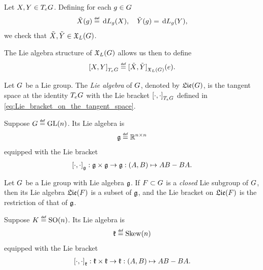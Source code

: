 Let $X, Y \in \TangentSpace \Group e$.
Defining for each $g \in \Group$
\begin{align*}
    \tilde X(g) \defeq \dd L_g(X), \quad \tilde Y(g) = \dd L_g(Y),
\end{align*}
we check that $\tilde X, \tilde Y \in \LeftInvariantVectorFields$.

The Lie algebra structure of $\LeftInvariantVectorFields$ allows us then to define
\begin{align}
    \LieBracket [\TangentSpace \Group e] X Y \defeq \LieBracket [\LeftInvariantVectorFields] {\tilde X} {\tilde Y}(e).
    \label{eq:Lie_bracket_on_the_tangent_space}
\end{align}

\begin{definition}
\label{definition:Lie_algebra_of_Lie_group}
    Let $\Group$ be a Lie group.
    The \emph{Lie algebra} of $\Group$, denoted by $\Lie(\Group)$, is the tangent space at the identity $\TangentSpace \Group e$
    with the Lie bracket $\LieBracket [\TangentSpace \Group e] \dummy \dummy$
    defined in \eqref{eq:Lie_bracket_on_the_tangent_space}.
\end{definition}

\begin{example}
\label{example:Lie_algebra_of_GL_n}
    Suppose $\Group \defeq \GeneralLinear n$.
    Its Lie algebra is
    \begin{align*}
        \LieAlgebra \defeq \SquareMatrices n
    \end{align*}
    equipped with the Lie bracket
    \begin{align*}
        \LieBracket [\LieAlgebra] \dummy \dummy : \LieAlgebra \times \LieAlgebra \to \LieAlgebra : (A, B) \mapsto AB - BA.
    \end{align*}
\end{example}

\begin{proposition}
    Let $\Group$ be a Lie group with Lie algebra $\LieAlgebra$.
    If $F \subset \Group$ is a \emph{closed} Lie subgroup of $\Group$,
    then its Lie algebra $\Lie(F)$ is a subset of $\LieAlgebra$,
    and the Lie bracket on $\Lie(F)$ is the restriction of that of $\LieAlgebra$.
\end{proposition}

\begin{example}
\label{example:Lie_algebra_of_SO_n}
    Suppose $\CompactGroup \defeq \SpecialOrthogonalGroup n$.
    Its Lie algebra is
    \begin{align*}
        \LieAlgebraCompactGroup \defeq \SkewSymmetric n
    \end{align*}
    equipped with the Lie bracket
    \begin{align*}
        \LieBracket [\LieAlgebraCompactGroup] \dummy \dummy : \LieAlgebraCompactGroup \times \LieAlgebraCompactGroup \to \LieAlgebraCompactGroup : (A, B) \mapsto AB - BA.
    \end{align*}
\end{example}

